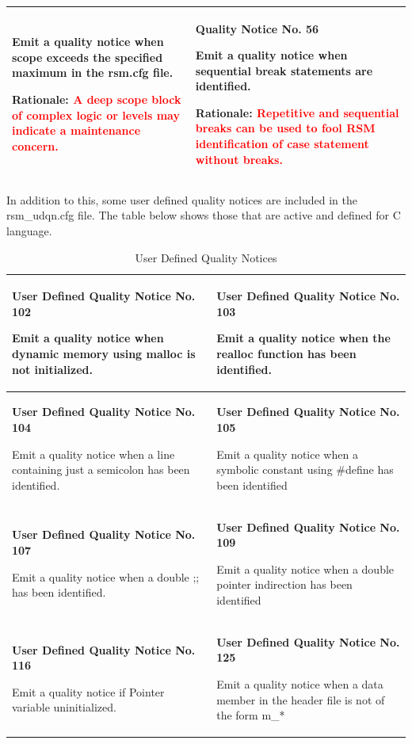 {\begin{longtable}{||p{}|p{}||}
Emit a quality notice when scope exceeds the specified maximum in the rsm.cfg file. 
 
Rationale: \textcolor{red}{A deep scope block of complex logic or levels may indicate a maintenance concern.}
 & \textbf{Quality Notice No. 56}
 
Emit a quality notice when sequential break statements are identified.

Rationale: \textcolor{red}{Repetitive and sequential breaks can be used to fool RSM identification of case statement without breaks.}
    \\
    \hline
\end{longtable}}

In addition to this, some user defined quality notices are included in the rsm\_udqn.cfg file. The table below shows those that are active and defined for C language.

{\footnotesize\sffamily\centering
  \begin{longtable}{||p{}|p{}||}
  \caption{User Defined Quality Notices}\\
    \hline\hline
    \hline\hline
    \endhead
    \hline\hline
    \endfoot
    \textbf{User Defined Quality Notice No. 102}

Emit a quality notice when dynamic memory using malloc is not initialized.
& \textbf{User Defined Quality Notice No. 103}

Emit a quality notice when the realloc function has been identified.  
    \\
    \hline \textbf{User Defined Quality Notice No. 104}
    
Emit a quality notice when a line containing just a semicolon has been identified.  
& \textbf{User Defined Quality Notice No. 105}
 
Emit a quality notice when a symbolic constant using \#define has been identified
    \\
    \hline \textbf{User Defined Quality Notice No. 107}
    
Emit a quality notice when a double ;; has been identified.  
& \textbf{User Defined Quality Notice No. 109}
 
Emit a quality notice when a double pointer indirection has been identified
    \\
    \hline \textbf{User Defined Quality Notice No. 116}
    
Emit a quality notice if Pointer variable uninitialized.  
& \textbf{User Defined Quality Notice No. 125}
 
Emit a quality notice when a data member in the header file is not of the form m\_*
    \\
    \hline
\end{longtable}}

